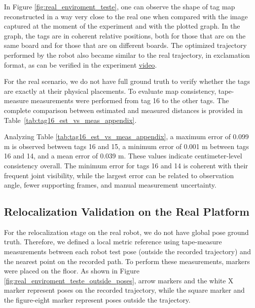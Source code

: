 \documentclass[a4paper,11pt]{article}
\begin{document}
In Figure \ref{fig:real_enviroment_teste}, one can observe the shape of tag map reconstructed in a way very close to the real one when compared with the image captured at the moment of the experiment and with the plotted graph. In the graph, the tags are in coherent relative positions, both for those that are on the same board and for those that are on different boards. The optimized trajectory performed by the robot also became similar to the real trajectory, in exclamation format, as can be verified in the experiment  \href{https://wirelessbrains.github.io/project_record_relocalize_apriltags_M2_PAR/}{video}.



For the real scenario, we do not have full ground truth to verify whether the tags are exactly at their physical placements. To evaluate map consistency, tape-measure measurements were performed from tag 16 to the other tags. The complete comparison between estimated and measured distances is provided in Table~\ref{tab:tag16_est_vs_meas_appendix}.

Analyzing Table \ref{tab:tag16_est_vs_meas_appendix}, a maximum error of 0.099 m is observed between tags 16 and 15, a minimum error of 0.001 m between tags 16 and 14, and a mean error of 0.039 m. These values indicate centimeter-level consistency overall. The minimum error for tags 16 and 14 is coherent with their frequent joint visibility, while the largest error can be related to observation angle, fewer supporting frames, and manual measurement uncertainty.

\subsection{Relocalization Validation on the Real Platform}
\label{subsec:real_results}

For the relocalization stage on the real robot, we do not have global pose ground truth. Therefore, we defined a local metric reference using tape-measure measurements between each robot test pose (outside the recorded trajectory) and the nearest point on the recorded path. To perform these measurements, markers were placed on the floor. As shown in Figure \ref{fig:real_enviroment_teste_outside_poses}, arrow markers and the white X marker represent poses on the recorded trajectory, while the square marker and the figure-eight marker represent poses outside the trajectory.
\end{document}
